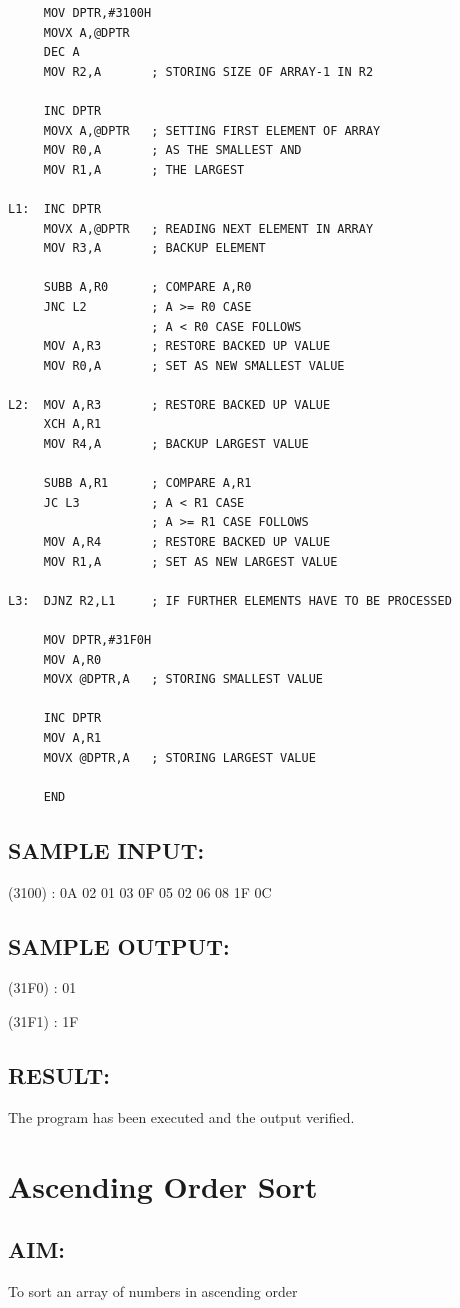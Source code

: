 \documentclass[a4paper,28pt,twoside,openright]{report}
\begin{document}
\begin{lstlisting}
     MOV DPTR,#3100H
     MOVX A,@DPTR
     DEC A
     MOV R2,A       ; STORING SIZE OF ARRAY-1 IN R2
     
     INC DPTR
     MOVX A,@DPTR   ; SETTING FIRST ELEMENT OF ARRAY
     MOV R0,A       ; AS THE SMALLEST AND
     MOV R1,A       ; THE LARGEST
     
L1:  INC DPTR
     MOVX A,@DPTR   ; READING NEXT ELEMENT IN ARRAY
     MOV R3,A       ; BACKUP ELEMENT
     
     SUBB A,R0      ; COMPARE A,R0
     JNC L2         ; A >= R0 CASE
                    ; A < R0 CASE FOLLOWS
     MOV A,R3       ; RESTORE BACKED UP VALUE
     MOV R0,A       ; SET AS NEW SMALLEST VALUE
     
L2:  MOV A,R3       ; RESTORE BACKED UP VALUE
     XCH A,R1
     MOV R4,A       ; BACKUP LARGEST VALUE
     
     SUBB A,R1      ; COMPARE A,R1
     JC L3          ; A < R1 CASE
                    ; A >= R1 CASE FOLLOWS
     MOV A,R4       ; RESTORE BACKED UP VALUE
     MOV R1,A       ; SET AS NEW LARGEST VALUE
     
L3:  DJNZ R2,L1     ; IF FURTHER ELEMENTS HAVE TO BE PROCESSED

     MOV DPTR,#31F0H
     MOV A,R0
     MOVX @DPTR,A   ; STORING SMALLEST VALUE
     
     INC DPTR
     MOV A,R1
     MOVX @DPTR,A   ; STORING LARGEST VALUE
     
     END
\end{lstlisting}

\section*{SAMPLE INPUT:}
(3100) : 0A 02 01 03 0F 05 02 06 08 1F 0C
\section*{SAMPLE OUTPUT:}
(31F0) : 01

(31F1) : 1F
\section*{RESULT:}
The program has been executed and the output verified.
%
%
\chapter{Ascending Order Sort}
%
%
\section*{AIM:}
To sort an array of numbers in ascending order
\end{document}
